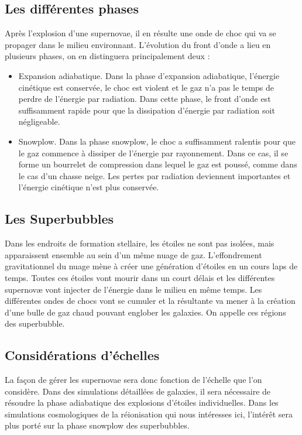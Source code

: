 \subsection{Les différentes phases}
Après l'explosion d'une supernovae, il en résulte une onde de choc qui va se propager dans le milieu environnant.
L'évolution du front d'onde a lieu en plusieurs phases, on en distinguera principalement deux : 

\begin{itemize}
\item Expansion adiabatique.
Dans la phase d'expansion adiabatique, l'énergie cinétique est conservée, le choc est violent et le gaz n'a pas le temps de perdre de l'énergie par radiation.
Dans cette phase, le front d'onde est suffisamment rapide pour que la dissipation d'énergie par radiation soit négligeable.

\item Snowplow.
Dans la phase snowplow, le choc a suffisamment ralentis pour que le gaz commence à dissiper de l'énergie par rayonnement.
Dans ce cas, il se forme un bourrelet de compression dans lequel le gaz est poussé, comme dans le cas d'un chasse neige. 
Les pertes par radiation deviennent importantes et l'énergie cinétique n'est plus conservée.
\end{itemize}

\subsection{Les Superbubbles}

Dans les endroits de formation stellaire, les étoiles ne sont pas isolées, mais apparaissent ensemble au sein d'un même nuage de gaz.
L'effondrement gravitationnel du nuage mène à créer une génération d’étoiles en un cours laps de temps.
Toutes ces étoiles vont mourir dans un court délais et les différentes supernovæ vont injecter de l’énergie dans le milieu en même temps.
Les différentes ondes de chocs vont se cumuler et la résultante va mener à la création d'une bulle de gaz chaud pouvant englober les galaxies.
On appelle ces régions des  superbubble.

\subsection{Considérations d'échelles}
La façon de gérer les supernovae sera donc fonction de l'échelle que l'on considère.
Dans des simulations détaillées de galaxies, il sera nécessaire de résoudre la phase adiabatique des explosions d'étoiles individuelles. %
Dans les simulations cosmologiques de la réionisation qui nous intéresses ici, l’intérêt sera plus porté sur la phase snowplow des superbubbles.

